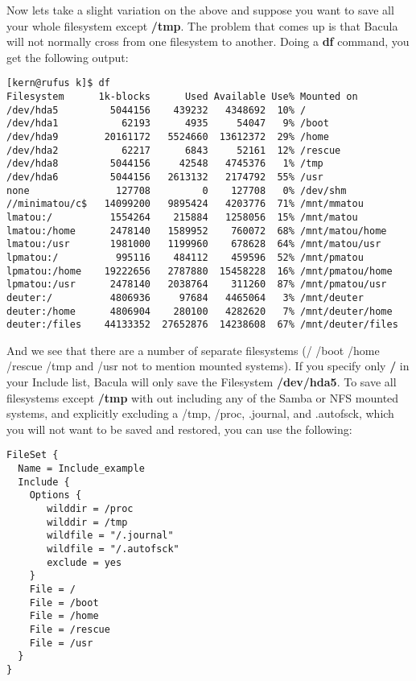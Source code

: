 Now lets take a slight variation on the above and suppose
you want to save all your whole filesystem except {\bf /tmp}. 
The problem that comes up is that Bacula will not normally
cross from one filesystem to another.
Doing a {\bf df} command, you get the following output: 

\footnotesize
\begin{verbatim}
[kern@rufus k]$ df
Filesystem      1k-blocks      Used Available Use% Mounted on
/dev/hda5         5044156    439232   4348692  10% /
/dev/hda1           62193      4935     54047   9% /boot
/dev/hda9        20161172   5524660  13612372  29% /home
/dev/hda2           62217      6843     52161  12% /rescue
/dev/hda8         5044156     42548   4745376   1% /tmp
/dev/hda6         5044156   2613132   2174792  55% /usr
none               127708         0    127708   0% /dev/shm
//minimatou/c$   14099200   9895424   4203776  71% /mnt/mmatou
lmatou:/          1554264    215884   1258056  15% /mnt/matou
lmatou:/home      2478140   1589952    760072  68% /mnt/matou/home
lmatou:/usr       1981000   1199960    678628  64% /mnt/matou/usr
lpmatou:/          995116    484112    459596  52% /mnt/pmatou
lpmatou:/home    19222656   2787880  15458228  16% /mnt/pmatou/home
lpmatou:/usr      2478140   2038764    311260  87% /mnt/pmatou/usr
deuter:/          4806936     97684   4465064   3% /mnt/deuter
deuter:/home      4806904    280100   4282620   7% /mnt/deuter/home
deuter:/files    44133352  27652876  14238608  67% /mnt/deuter/files
\end{verbatim}
\normalsize

And we see that there are a number of separate filesystems (/ /boot
/home /rescue /tmp and /usr not to mention mounted systems).
If you specify only {\bf /} in your Include list, Bacula will only save the
Filesystem {\bf /dev/hda5}. To save all filesystems except {\bf /tmp} with
out including any of the Samba or NFS mounted systems, and explicitly
excluding a /tmp, /proc, .journal, and .autofsck, which you will not want to
be saved and restored, you can use the following: 

\footnotesize
\begin{verbatim}
FileSet {
  Name = Include_example
  Include {
    Options {
       wilddir = /proc
       wilddir = /tmp
       wildfile = "/.journal"
       wildfile = "/.autofsck"
       exclude = yes
    }
    File = /
    File = /boot
    File = /home
    File = /rescue
    File = /usr
  }
}
\end{verbatim}
\normalsize


